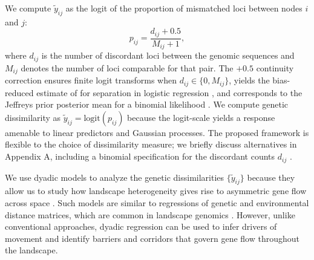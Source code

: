 \documentclass{article}
\begin{document}
We compute $\widetilde{y}_{ij}$ as the logit of the proportion of mismatched loci between nodes $i$ and $j$:
\begin{equation}\label{eq:pij}
    p_{ij}=\frac{d_{ij}+0.5}{M_{ij}+1},
\end{equation}
where $d_{ij}$ is the number of discordant loci between the genomic sequences and $M_{ij}$ denotes the number of loci comparable for that pair. 
The $+0.5$ continuity correction ensures finite logit transforms when $d_{ij}\in\{0,M_{ij}\}$, yields the bias-reduced estimate of \cite{firth1993bias} for separation in logistic regression \citep{heinze2002solution}, and corresponds to the Jeffreys prior posterior mean for a binomial likelihood \citep{chen2008properties}.
We compute genetic dissimilarity as $\widetilde{y}_{ij}=\text{logit}(p_{ij})$ because the logit-scale yields a response amenable to linear predictors and Gaussian processes.
The proposed framework is flexible to the choice of dissimilarity measure; we briefly discuss alternatives in Appendix A, including a binomial specification for the discordant counts $d_{ij}$ \citep{nei1972genetic,beaumont1998measuring}.


We use dyadic models to analyze the genetic dissimilarities $\{\widetilde{y}_{ij}\}$ because they allow us to study how landscape heterogeneity gives rise to asymmetric gene flow across space \citep{schwob2024composite}. Such models are similar to regressions of genetic and environmental distance matrices, which are common in landscape genomics \citep{balkenhol2009statistical,bradburd2013disentangling}. However, unlike conventional approaches, dyadic regression can be used to infer drivers of movement and identify barriers and corridors that govern gene flow throughout the landscape.
\end{document}
